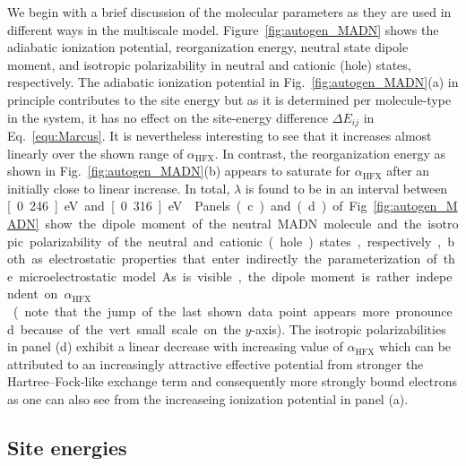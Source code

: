 \documentclass[%
 reprint,
superscriptaddress,
 amsmath,amssymb,
 aps,
prb,
floatfix
]{revtex4-2}
\newcommand{\bjoern}[2]{{\color{blue}{{\bf #1} #2}}}
\newcommand{\ahfx}{\ensuremath{\alpha_\text{HFX}}\xspace}
\begin{document}
We begin with a brief discussion of the molecular parameters as they are used in different ways in the multiscale model. Figure~\ref{fig:autogen_MADN} shows the adiabatic ionization potential, reorganization energy, neutral state dipole moment, and isotropic polarizability in neutral and cationic (hole) states, respectively. The adiabatic ionization potential in Fig.~\ref{fig:autogen_MADN}(a) in principle contributes to the site energy but as it is determined per molecule-type in the system, it has no effect on the site-energy difference $\Delta E_{ij}$ in Eq.~\ref{equ:Marcus}. It is nevertheless interesting to see that it increases almost linearly over the shown range of \ahfx. In contrast, the reorganization energy as shown in Fig.~\ref{fig:autogen_MADN}(b) appears to saturate for \ahfx after an initially close to linear increase. In total, $\lambda$ is found to be in an interval between \unit[0.246]{eV} and \unit[0.316]{eV} \bjoern{need}{correct numbers here}. Panels (c) and (d) of Fig.~\ref{fig:autogen_MADN} show the dipole moment of the neutral MADN molecule and the isotropic polarizability of the neutral and cationic (hole) states, respectively, both as electrostatic properties that enter indirectly the parameterization of the microelectrostatic model. As is visible, the dipole moment is rather independent on \ahfx (note that the jump of the last shown data point appears more pronounced because of the vert small scale on the $y$-axis). The isotropic polarizabilities in panel (d) exhibit a linear decrease with increasing value of \ahfx which can be attributed to an increasingly attractive effective potential from stronger the Hartree--Fock-like exchange term and consequently more strongly bound electrons as one can also see from the increaseing ionization potential in panel (a).  

\subsection{Site energies}
\end{document}
